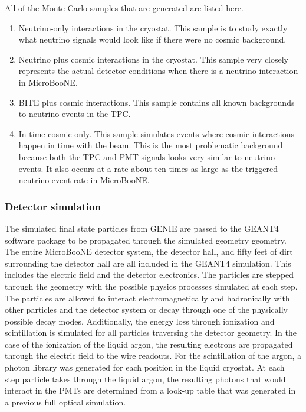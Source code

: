     All of the Monte Carlo samples that are generated are listed here.
    \begin{enumerate}
      \item Neutrino-only interactions in the cryostat. This sample is to study
      exactly what neutrino signals would look like if there were no cosmic
      background.
      \item Neutrino plus cosmic interactions in the cryostat. This sample
      very closely represents the actual detector conditions when there is a
      neutrino interaction in MicroBooNE.
      \item BITE plus cosmic interactions. This sample contains all known
      backgrounds to neutrino events in the TPC.
      \item In-time cosmic only. This sample simulates events where cosmic
      interactions happen in time with the beam. This is the most problematic
      background because both the TPC and PMT signals looks very similar to
      neutrino events. It also occurs at a rate about ten times as large as the
      triggered neutrino event rate in MicroBooNE.
    \end{enumerate}

  \subsubsection{Detector simulation}
    The simulated final state particles from GENIE are passed to the
    GEANT4~\cite{geant4} software package to be propagated through the
    simulated geometry geometry. The entire MicroBooNE detector system, the
    detector hall, and fifty feet of dirt surrounding the detector hall are all
    included in the GEANT4 simulation. This includes the electric field and the
    detector electronics. The particles are stepped through the geometry with
    the possible physics processes simulated at each step. The particles are
    allowed to interact electromagnetically and hadronically with other
    particles and the detector system or decay through one of the physically
    possible decay modes. Additionally, the energy loss through ionization and
    scintillation is simulated for all particles traversing the detector
    geometry. In the case of the ionization of the liquid argon, the resulting
    electrons are propagated through the electric field to the wire readouts.
    For the scintillation of the argon, a photon library was generated for each
    position in the liquid cryostat. At each step particle takes through the
    liquid argon, the resulting photons that would interact in the PMTs are
    determined from a look-up table that was generated in a previous full
    optical simulation. 


